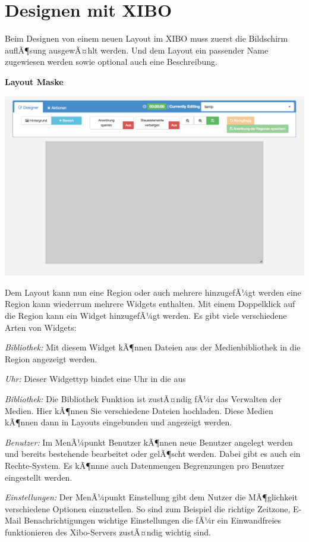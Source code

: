 \section{Designen mit XIBO}\label{sec:designexibo}
Beim Designen von einem neuen Layout im XIBO muss zuerst die Bildschirm auflÃ¶sung ausgewÃ¤hlt werden. Und dem Layout ein passender Name zugewiesen werden sowie optional auch eine Beschreibung. 

\textbf{Layout Maske}

\begin{calendar}
	\centering
\includegraphics[width=1\textwidth]{images/xibo-basics-designer}
	\label{Calendar}
\end{calendar}	

Dem Layout kann nun eine Region oder auch mehrere  hinzugefÃ¼gt werden eine Region kann wiederrum mehrere Widgets enthalten. Mit einem Doppelklick auf die Region kann ein Widget hinzugefÃ¼gt werden. Es gibt viele verschiedene Arten von Widgets:

\begin{widgettypes}
	\item {\em Bibliothek:} Mit diesem Widget kÃ¶nnen Dateien aus der Medienbibliothek in die Region angezeigt werden. 

	
	\item {\em Uhr:} 
	Dieser Widgettyp bindet eine Uhr in die aus
	
	\item {\em Bibliothek:} 
	Die Bibliothek Funktion ist zustÃ¤ndig fÃ¼r das Verwalten der Medien. Hier kÃ¶nnen Sie verschiedene Dateien hochladen.  Diese Medien kÃ¶nnen dann in Layouts eingebunden und angezeigt werden.
	
	\item {\em Benutzer:} 
	Im MenÃ¼punkt Benutzer kÃ¶nnen neue Benutzer angelegt werden und bereits bestehende bearbeitet oder gelÃ¶scht werden. Dabei gibt es auch ein Rechte-System. Es kÃ¶nnne auch Datenmengen Begrenzungen pro Benutzer eingestellt werden.
	
	\item {\em Einstellungen:} 
	Der MenÃ¼punkt Einstellung gibt dem Nutzer die MÃ¶glichkeit verschiedene Optionen einzustellen. So sind zum Beispiel die richtige Zeitzone, E-Mail Benachrichtigungen wichtige Einstellungen die fÃ¼r ein Einwandfreies funktionieren des Xibo-Servers zustÃ¤ndig wichtig sind.
\end{widgettypes}

